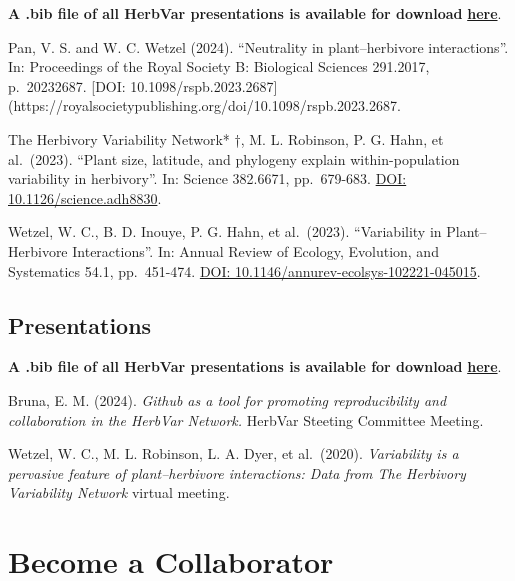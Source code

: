 \documentclass[
  letterpaper,
  oneside,
  open=any]{scrbook}
\begin{document}

\textbf{A .bib file of all HerbVar presentations is available for
download}
\href{https://raw.githubusercontent.com/HerbVar-Network/herbvar_manual/refs/heads/main/project_publications.bib?token=GHSAT0AAAAAAC2ASX4DDIAV62IX3MHNIRPQZZKNNXQ}{\textbf{here}}.

Pan, V. S. and W. C. Wetzel (2024). ``Neutrality in plant--herbivore
interactions''. In: Proceedings of the Royal Society B: Biological
Sciences 291.2017, p.~20232687. {[}DOI:
10.1098/rspb.2023.2687{]}(https://royalsocietypublishing.org/doi/10.1098/rspb.2023.2687.

The Herbivory Variability Network* †, M. L. Robinson, P. G. Hahn, et
al.~(2023). ``Plant size, latitude, and phylogeny explain
within-population variability in herbivory''. In: Science 382.6671,
pp.~679-683.
\href{https://www.science.org/doi/10.1126/science.adh8830}{DOI:
10.1126/science.adh8830}.

Wetzel, W. C., B. D. Inouye, P. G. Hahn, et al.~(2023). ``Variability in
Plant--Herbivore Interactions''. In: Annual Review of Ecology,
Evolution, and Systematics 54.1, pp.~451-474.
\href{https://www.annualreviews.org/content/journals/10.1146/annurev-ecolsys-102221-045015}{DOI:
10.1146/annurev-ecolsys-102221-045015}.

\chapter*{Presentations}\label{presentations}


\textbf{A .bib file of all HerbVar presentations is available for
download}
\href{https://raw.githubusercontent.com/HerbVar-Network/herbvar_manual/refs/heads/main/project_presentations.bib?token=GHSAT0AAAAAACX4VYS42HAPGEYMRUA6F7F2ZYGXO6A}{\textbf{here}}.

Bruna, E. M. (2024). \emph{Github as a tool for promoting
reproducibility and collaboration in the HerbVar Network.} HerbVar
Steeting Committee Meeting.

Wetzel, W. C., M. L. Robinson, L. A. Dyer, et al.~(2020).
\emph{Variability is a pervasive feature of plant--herbivore
interactions: Data from The Herbivory Variability Network} virtual
meeting.

\part{Become a Collaborator}
\end{document}
